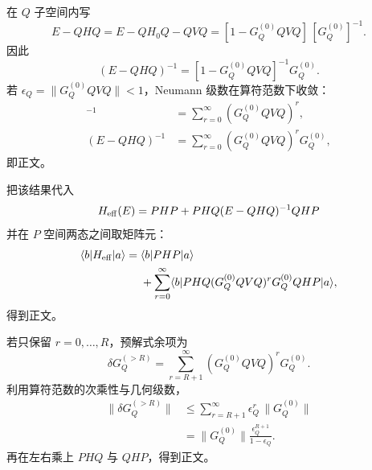 \begin{derivation}
在 $Q$ 子空间内写
\begin{equation*}
 E-QHQ
 =E-QH_0Q-QVQ
 =[1-G_Q^{(0)}QVQ]\,[G_Q^{(0)}]^{-1}.
\end{equation*}
因此
\begin{equation*}
 (E-QHQ)^{-1}
 =[1-G_Q^{(0)}QVQ]^{-1}G_Q^{(0)}.
\end{equation*}
若 $\epsilon_Q=\|G_Q^{(0)}QVQ\|<1$，Neumann 级数在算符范数下收敛：
\begin{align*}
 [1-G_Q^{(0)}QVQ]^{-1}
 &=\sum_{r=0}^{\infty}(G_Q^{(0)}QVQ)^r,\\
 (E-QHQ)^{-1}
 &=\sum_{r=0}^{\infty}(G_Q^{(0)}QVQ)^rG_Q^{(0)},
\end{align*}
即正文。

把该结果代入
\begin{equation*}
 H_{\rm eff}(E)=PHP+PHQ(E-QHQ)^{-1}QHP
\end{equation*}
并在 $P$ 空间两态之间取矩阵元：
\begin{align*}
 \langle b|H_{\rm eff}|a\rangle
 ={}&\langle b|PHP|a\rangle\\
 &+\sum_{r=0}^{\infty}
 \langle b|PHQ
 (G_Q^{(0)}QVQ)^rG_Q^{(0)}QHP|a\rangle,
\end{align*}
得到正文。

若只保留 $r=0,\ldots,R$，预解式余项为
\begin{equation*}
 \delta G_Q^{(>R)}
 =\sum_{r=R+1}^{\infty}(G_Q^{(0)}QVQ)^rG_Q^{(0)}.
\end{equation*}
利用算符范数的次乘性与几何级数，
\begin{align*}
 \|\delta G_Q^{(>R)}\|
 &\le
 \sum_{r=R+1}^{\infty}\epsilon_Q^r\,\|G_Q^{(0)}\|\\
 &=\|G_Q^{(0)}\|
 \frac{\epsilon_Q^{R+1}}{1-\epsilon_Q}.
\end{align*}
再在左右乘上 $PHQ$ 与 $QHP$，得到正文。
\end{derivation}

